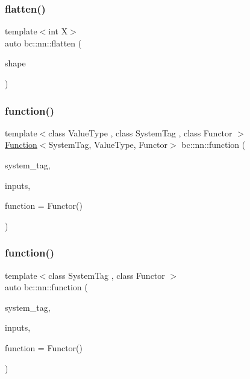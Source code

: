 \mbox{\label{namespacebc_1_1nn_ac038324e88b3931fb3f8fb92b809a4f5}} 
\subsubsection{\texorpdfstring{flatten()}{flatten()}\hspace{0.1cm}{\footnotesize\ttfamily [3/3]}}
{\footnotesize\ttfamily template$<$int X$>$ \\
auto bc\+::nn\+::flatten (\begin{DoxyParamCaption}\item[{\hyperlink{structbc_1_1Dim}{Dim}$<$ X $>$}]{shape }\end{DoxyParamCaption})}

\mbox{\label{namespacebc_1_1nn_a0fef36d0002a6d7c7cb619d7e27d5c1e}} 
\subsubsection{\texorpdfstring{function()}{function()}\hspace{0.1cm}{\footnotesize\ttfamily [1/4]}}
{\footnotesize\ttfamily template$<$class Value\+Type , class System\+Tag , class Functor $>$ \\
\hyperlink{structbc_1_1nn_1_1Function}{Function}$<$System\+Tag, Value\+Type, Functor$>$ bc\+::nn\+::function (\begin{DoxyParamCaption}\item[{System\+Tag}]{system\+\_\+tag,  }\item[{int}]{inputs,  }\item[{Functor}]{function = {\ttfamily Functor()} }\end{DoxyParamCaption})}

\mbox{\label{namespacebc_1_1nn_a276a5ca53a08ea4d75b06e49c29ba08b}} 
\subsubsection{\texorpdfstring{function()}{function()}\hspace{0.1cm}{\footnotesize\ttfamily [2/4]}}
{\footnotesize\ttfamily template$<$class System\+Tag , class Functor $>$ \\
auto bc\+::nn\+::function (\begin{DoxyParamCaption}\item[{System\+Tag}]{system\+\_\+tag,  }\item[{int}]{inputs,  }\item[{Functor}]{function = {\ttfamily Functor()} }\end{DoxyParamCaption})}

